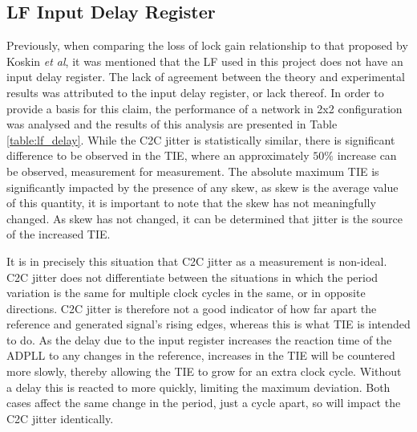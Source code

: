 \subsection{\ac{LF} Input Delay Register}\label{subsection:lf_delay}
Previously, when comparing the loss of lock gain relationship to that proposed by Koskin \textit{et al}, it was mentioned that the \ac{LF} used in this project does not have an input delay register. The lack of agreement between the theory and experimental results was attributed to the input delay register, or lack thereof. In order to provide a basis for this claim, the performance of a network in 2x2 configuration was analysed and the results of this analysis are presented in Table \ref{table:lf_delay}. While the \ac{C2C} jitter is statistically similar, there is significant difference to be observed in the \ac{TIE}, where an approximately $50\%$ increase can be observed, measurement for measurement. The absolute maximum \ac{TIE} is significantly impacted by the presence of any skew, as skew is the average value of this quantity, it is important to note that the skew has not meaningfully changed. As skew has not changed, it can be determined that jitter is the source of the increased \ac{TIE}.


It is in precisely this situation that \ac{C2C} jitter as a measurement is non-ideal. \ac{C2C} jitter does not differentiate between the situations in which the period variation is the same for multiple clock cycles in the same, or in opposite directions. \ac{C2C} jitter is therefore not a good indicator of how far apart the reference and generated signal's rising edges, whereas this is what \ac{TIE} is intended to do. As the delay due to the input register increases the reaction time of the \ac{ADPLL} to any changes in the reference, increases in the \ac{TIE} will be countered more slowly, thereby allowing the \ac{TIE} to grow for an extra clock cycle. Without a delay this is reacted to more quickly, limiting the maximum deviation. Both cases affect the same change in the period, just a cycle apart, so will impact the \ac{C2C} jitter identically.

